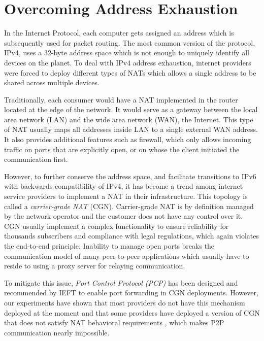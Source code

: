 \section{Overcoming Address Exhaustion}

In the Internet Protocol, each computer gets assigned an address which is subsequently used for packet routing. The most common version of the protocol, IPv4, uses a 32-byte address space which is not enough to uniquely identify all devices on the planet. To deal with IPv4 address exhaustion, internet providers were forced to deploy different types of NATs which allows a single address to be shared across multiple devices.

Traditionally, each consumer would have a NAT implemented in the router located at the edge of the network. It would serve as a gateway between the local area network (LAN) and the wide area network (WAN), the Internet. This type of NAT usually maps all addresses inside LAN to a single external WAN address. It also provides additional features such as firewall, which only allows incoming traffic on ports that are explicitly open, or on whose the client initiated the communication first.


However, to further conserve the address space, and facilitate transitions to IPv6 with backwards compatibility of IPv4, it has become a trend among internet service providers to implement a NAT in their infrastructure. This topology is called a \textit{carrier-grade NAT} (CGN). Carrier-grade NAT is by definition managed by the network operator and the customer does not have any control over it. CGN usually implement a complex functionality to ensure reliability for thousands subscribers and compliance with legal regulations, which again violates the end-to-end principle. Inability to manage open ports breaks the communication model of many peer-to-peer applications which usually have to reside to using a proxy server for relaying communication.

To mitigate this issue, \textit{Port Control Protocol (PCP)} \cite{pcp} has been designed and recommended by IEFT to enable port forwarding in CGN deployments. However, our experiments have shown that most providers do not have this mechanism deployed at the moment and that some providers have deployed a version of CGN that does not satisfy NAT behavioral requirements \cite{behave}, which makes P2P communication nearly impossible.

